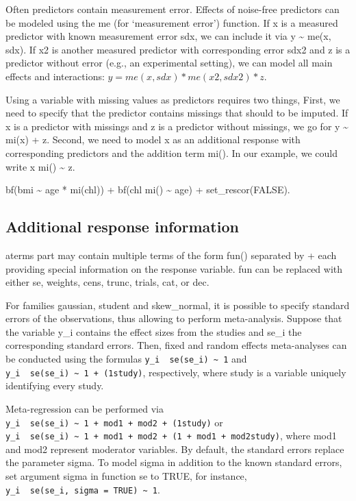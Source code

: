 \documentclass[]{book}
\begin{document}
Often predictors contain measurement error. Effects of noise-free predictors can be modeled using the me (for `measurement error') function. If x is a measured predictor with known measurement error sdx, we can include it via y \textasciitilde{} me(x, sdx). If x2 is another measured predictor with corresponding error sdx2 and z is a predictor without error (e.g., an experimental setting), we can model all main effects and interactions: \(y = me(x, sdx) * me(x2, sdx2) * z\).

Using a variable with missing values as predictors requires two things, First, we need to specify that the predictor contains missings that should to be imputed. If x is a predictor with missings and z is a predictor without missings, we go for y \textasciitilde{} mi(x) + z. Second, we need to model x as an additional response with corresponding predictors and the addition term mi(). In our example, we could write x \textbar{} mi() \textasciitilde{} z.

bf(bmi \textasciitilde{} age * mi(chl)) + bf(chl \textbar{} mi() \textasciitilde{} age) + set\_rescor(FALSE).

\hypertarget{additional-response-information}{%
\subsection{Additional response information}\label{additional-response-information}}

aterms part may contain multiple terms of the form fun() separated by + each providing special information on the response variable. fun can be replaced with either se, weights, cens, trunc, trials, cat, or dec.

For families gaussian, student and skew\_normal, it is possible to specify standard errors of the observations, thus allowing to perform meta-analysis. Suppose that the variable y\_i contains the effect sizes from the studies and se\_i the corresponding standard errors. Then, fixed and random effects meta-analyses can be conducted using the formulas \texttt{y\_i\ \textbar{}\ se(se\_i)\ \textasciitilde{}\ 1} and \texttt{y\_i\ \textbar{}\ se(se\_i)\ \textasciitilde{}\ 1\ +\ (1\textbar{}study)}, respectively, where study is a variable uniquely identifying every study.

Meta-regression can be performed via \texttt{y\_i\ \textbar{}\ se(se\_i)\ \textasciitilde{}\ 1\ +\ mod1\ +\ mod2\ +\ (1\textbar{}study)} or
\texttt{y\_i\ \textbar{}\ se(se\_i)\ \textasciitilde{}\ 1\ +\ mod1\ +\ mod2\ +\ (1\ +\ mod1\ +\ mod2\textbar{}study)}, where mod1 and mod2 represent moderator variables. By default, the standard errors replace the parameter sigma. To model sigma in addition to the known standard errors, set argument sigma in function se to TRUE, for instance, \texttt{y\_i\ \textbar{}\ se(se\_i,\ sigma\ =\ TRUE)\ \textasciitilde{}\ 1}.
\end{document}
